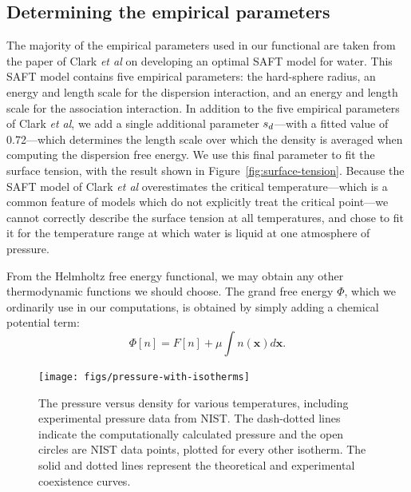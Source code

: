 \documentclass[letterpaper,twocolumn,amsmath,amssymb,prb]{revtex4-1}
\newcommand{\xx}{\textbf{x}}
\begin{document}
\subsection{Determining the empirical parameters}\label{sec:empirical}

The majority of the empirical parameters used in our functional are
taken from the paper of Clark \emph{et al} on developing an optimal
SAFT model for water\cite{clark2006developing}.  This SAFT model
contains five empirical parameters: the hard-sphere radius, an energy
and length scale for the dispersion interaction, and an energy and
length scale for the association interaction.  In addition to the five
empirical parameters of Clark \emph{et al}, we add a single additional
parameter $s_d$---with a fitted value of 0.72---which determines
the length scale over which the density is averaged when computing the
dispersion free energy.  We use this final parameter to fit the
surface tension, with the result shown in
Figure~\ref{fig:surface-tension}.  Because the SAFT model of Clark
\emph{et al} overestimates the critical temperature---which is a
common feature of models which do not explicitly treat the critical
point---we cannot correctly describe the surface tension at all
temperatures, and chose to fit it for the temperature range at which
water is liquid at one atmosphere of pressure.

From the Helmholtz free energy functional, we may obtain any other
thermodynamic functions we should choose.  The grand free energy
$\Phi$, which we ordinarily use in our computations, is obtained by
simply adding a chemical potential term:
\begin{equation}
  \Phi[n] = F[n] + \mu \int n(\xx) d\xx.
\end{equation}

\begin{figure}
\begin{center}
\texttt{[image: figs/pressure-with-isotherms]}
\end{center}
\caption{The pressure versus density for various temperatures, including
experimental pressure data from NIST\cite{nistwater}. The dash-dotted lines
indicate the computationally calculated pressure and the open circles are 
NIST data points, plotted for every other isotherm. The solid and dotted lines
represent the theoretical and experimental coexistence curves.}
\label{fig:pressure-with-isotherms}
\end{figure}
\end{document}
